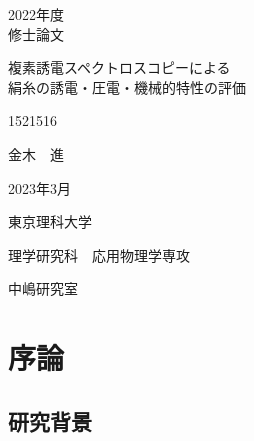 \documentclass[dvipdfmx,12pt,a4paper]{jreport}
\begin{document}
	\begin{titlepage}
		
		\begin{center}
			
			\vspace{20truept}
			{\LARGE 2022年度}\\
			\vspace{15truept}
			{\LARGE 修士論文}
			
			\vspace{50truept}
			
			{\Huge 複素誘電スペクトロスコピーによる\\絹糸の誘電・圧電・機械的特性の評価}\\
			\vspace{10truept}
			
			\vspace*{280truept}
			
			{\LARGE 1521516}\\
			\vspace{5truept}
			
			{\LARGE 金木　進}\\
			\vspace{60truept}
			
			{\LARGE 2023年3月}
			\vspace{30truept}
			
			{\LARGE 東京理科大学}\\
			\vspace{15truept}
			
			{\LARGE 理学研究科　応用物理学専攻}\\
			\vspace{15truept}
			
			{\LARGE 中嶋研究室}\\
			
		\end{center}
		
		
	\end{titlepage}
  \thispagestyle{empty}
	\clearpage
\addtocounter{page}{0}
\tableofcontents
  \chapter{序論}
		\section{研究背景}
\end{document}
